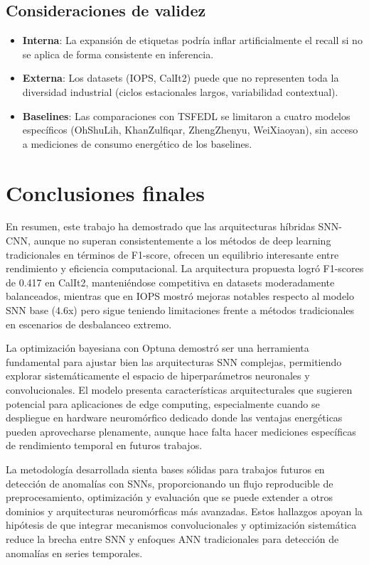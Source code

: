 \subsection{Consideraciones de validez}
\begin{itemize}
    \item \textbf{Interna}: La expansión de etiquetas podría inflar artificialmente el recall si no se aplica de forma consistente en inferencia.
    \item \textbf{Externa}: Los datasets (IOPS, CalIt2) puede que no representen toda la diversidad industrial (ciclos estacionales largos, variabilidad contextual).
    \item \textbf{Baselines}: Las comparaciones con TSFEDL se limitaron a cuatro modelos específicos (OhShuLih, KhanZulfiqar, ZhengZhenyu, WeiXiaoyan), sin acceso a mediciones de consumo energético de los baselines.
\end{itemize}

\section{Conclusiones finales}
En resumen, este trabajo ha demostrado que las arquitecturas híbridas SNN-CNN, aunque no superan consistentemente a los métodos de deep learning tradicionales en términos de F1-score, ofrecen un equilibrio interesante entre rendimiento y eficiencia computacional. La arquitectura propuesta logró F1-scores de 0.417 en CalIt2, manteniéndose competitiva en datasets moderadamente balanceados, mientras que en IOPS mostró mejoras notables respecto al modelo SNN base (4.6x) pero sigue teniendo limitaciones frente a métodos tradicionales en escenarios de desbalanceo extremo.

La optimización bayesiana con Optuna demostró ser una herramienta fundamental para ajustar bien las arquitecturas SNN complejas, permitiendo explorar sistemáticamente el espacio de hiperparámetros neuronales y convolucionales. El modelo presenta características arquitecturales que sugieren potencial para aplicaciones de edge computing, especialmente cuando se despliegue en hardware neuromórfico dedicado donde las ventajas energéticas pueden aprovecharse plenamente, aunque hace falta hacer mediciones específicas de rendimiento temporal en futuros trabajos.

La metodología desarrollada sienta bases sólidas para trabajos futuros en detección de anomalías con SNNs, proporcionando un flujo reproducible de preprocesamiento, optimización y evaluación que se puede extender a otros dominios y arquitecturas neuromórficas más avanzadas.
Estos hallazgos apoyan la hipótesis de que integrar mecanismos convolucionales y optimización sistemática reduce la brecha entre SNN y enfoques ANN tradicionales para detección de anomalías en series temporales.


